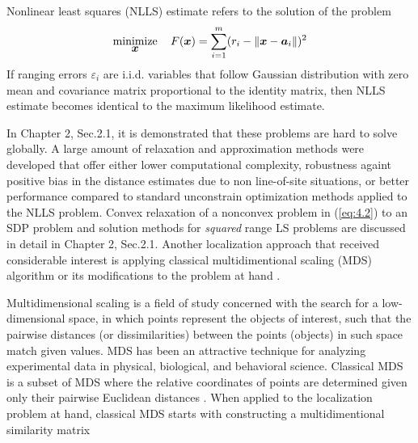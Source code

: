 Nonlinear least squares (NLLS) estimate refers to the solution of the problem
\begin{equation}\label{eq:4.2} %
\Min_{\Bx} \quad F(\Bx)=\sum_{i=1}^{m} (r_i - \|{\Bx} - {\Ba}_i\|)^2
\end{equation}
If ranging errors $\varepsilon_i$ are i.i.d. variables that follow Gaussian distribution with zero mean and covariance matrix proportional to the identity matrix, then NLLS estimate becomes identical to the maximum likelihood estimate. 



In Chapter 2, Sec.2.1, it is demonstrated that these problems are hard to solve globally. A large amount of relaxation and approximation methods were developed that offer either lower computational complexity, robustness againt positive bias in the distance estimates due to non line-of-site situations, or better performance compared to standard unconstrain optimization methods applied to the NLLS problem. Convex relaxation of a nonconvex problem in (\ref{eq:4.2}) to an SDP problem and solution methods for \textit{squared} range LS problems are discussed in detail in Chapter 2, Sec.2.1. Another localization approach that received considerable interest is applying classical multidimentional scaling (MDS) algorithm or its modifications to the problem at hand \cite{classMDS, fastMDS, dwMDS}. 

Multidimensional scaling  is a field of study concerned with the search for a low-dimensional space, in which points  represent the objects of interest, such that the pairwise distances (or dissimilarities) between the points (objects) in such space match given values. MDS has been an attractive technique for analyzing experimental data in physical, biological, and behavioral science. Classical MDS is a subset of MDS where the relative coordinates of points  are determined given only their pairwise Euclidean distances \cite{classMDS}.
%
%
When applied to the localization problem at hand, classical MDS starts with constructing a multidimentional similarity matrix
 
